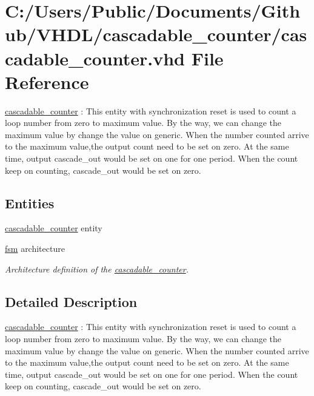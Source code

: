 \hypertarget{cascadable__counter_8vhd}{}\section{C\+:/\+Users/\+Public/\+Documents/\+Github/\+V\+H\+D\+L/cascadable\+\_\+counter/cascadable\+\_\+counter.vhd File Reference}
\label{cascadable__counter_8vhd}


\hyperlink{classcascadable__counter}{cascadable\+\_\+counter} \+: This entity with synchronization reset is used to count a loop number from zero to maximum value. By the way, we can change the maximum value by change the value on generic. When the number counted arrive to the maximum value,the output \textquotesingle{}count\textquotesingle{} need to be set on zero. At the same time, output \textquotesingle{}cascade\+\_\+out\textquotesingle{} would be set on one for one period. When the \textquotesingle{}count\textquotesingle{} keep on counting, \textquotesingle{}cascade\+\_\+out\textquotesingle{} would be set on zero.  


\subsection*{Entities}
\begin{DoxyCompactItemize}
\item 
\hyperlink{classcascadable__counter}{cascadable\+\_\+counter} entity
\item 
\hyperlink{classcascadable__counter_1_1fsm}{fsm} architecture
\begin{DoxyCompactList}\small\item\em Architecture definition of the \hyperlink{classcascadable__counter}{cascadable\+\_\+counter}. \end{DoxyCompactList}\end{DoxyCompactItemize}


\subsection{Detailed Description}
\hyperlink{classcascadable__counter}{cascadable\+\_\+counter} \+: This entity with synchronization reset is used to count a loop number from zero to maximum value. By the way, we can change the maximum value by change the value on generic. When the number counted arrive to the maximum value,the output \textquotesingle{}count\textquotesingle{} need to be set on zero. At the same time, output \textquotesingle{}cascade\+\_\+out\textquotesingle{} would be set on one for one period. When the \textquotesingle{}count\textquotesingle{} keep on counting, \textquotesingle{}cascade\+\_\+out\textquotesingle{} would be set on zero. 

